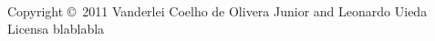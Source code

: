 \thispagestyle{empty}
\clearpage

\\[1cm]
\noindent Copyright \copyright\ 2011
Vanderlei Coelho de Olivera Junior and Leonardo Uieda
\\[0.5cm]
\noindent Licensa blablabla
